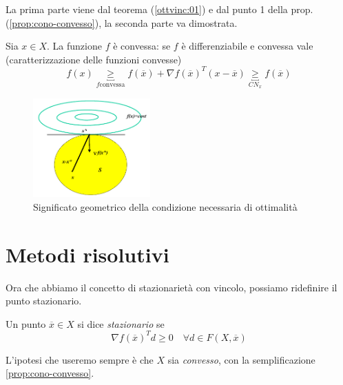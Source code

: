 \begin{thproof}
La prima parte viene dal teorema (\ref{ottvinc:01}) e dal punto 1 della prop. (\ref{prop:cono-convesso}), la seconda parte va dimostrata.

Sia $x \in X$. La funzione $f$ \`e convessa: se $f$ \`e differenziabile
e convessa vale (caratterizzazione delle funzioni convesse)
$$ f(x) \underbracket{\geq}_{f \text{convessa}}
f(\overline{x}) + {\nabla f(\overline{x})^{T}(x- \overline{x})}
\underbracket{\geq}_{CN_x} f(\overline{x})
$$
\end{thproof}
\begin{figure}[h!]
 \centering
 \includegraphics[width=0.4\textwidth]{./imgs/ottvinc08.png}
 \caption{Significato geometrico della condizione necessaria di ottimalit\`a}
\end{figure}

\section{Metodi risolutivi}

Ora che abbiamo il concetto di stazionarietà con vincolo, possiamo
ridefinire il punto stazionario.

\begin{defn}
  Un punto $\overline{x} \in X$ si dice \emph{stazionario} se
  $$ \nabla f(\overline{x})^{T}d \geq 0 \quad \forall  d \in F(X, \overline{x})$$
\end{defn}
L'ipotesi che useremo sempre \`e che $X$ sia \emph{convesso}, con la
semplificazione \ref{prop:cono-convesso}.\\

